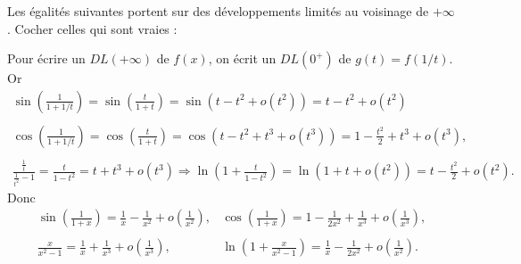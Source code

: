 \begin{question}
Les égalités suivantes portent sur des développements limités au voisinage de $+\infty$. Cocher celles qui sont vraies :
\begin{answers}  
\end{answers}
\vskip2mm
\begin{explanations}
Pour écrire un $DL(+\infty)$ de $f(x)$, on écrit un $DL(0^+)$ de $g(t)=f(1/t)$. Or
$$\begin{array}{l}\displaystyle \sin\left(\frac{1}{1+1/t}\right)=\sin \left(\frac{t}{1+t}\right)=\sin \left(t-t^2+o(t^2)\right)=t-t^2+o(t^2)\\ \\ \displaystyle \cos\left(\frac{1}{1+1/t}\right)=\cos \left(\frac{t}{1+t}\right)=\cos \left(t-t^2+t^3+o(t^3)\right)=1-\frac{t^2}{2}+t^3+o(t^3),\\ \\ \displaystyle \frac{\frac{1}{t}}{\frac{1}{t^2}-1}=\frac{t}{1-t^2}=t+t^3+o(t^3)\Rightarrow \ln \left(1+\frac{t}{1-t^2}\right)=\ln \left(1+t+o(t^2)\right)=t-\frac{t^2}{2}+o(t^2).\end{array}$$
Donc
$$\begin{array}{ll}\displaystyle \sin \left(\frac{1}{1+x}\right)=\frac{1}{x}-\frac{1}{x^2}+o\left(\frac{1}{x^2}\right),&\displaystyle \cos \left(\frac{1}{1+x}\right)=1-\frac{1}{2x^2}+\frac{1}{x^3}+o\left(\frac{1}{x^3}\right),\\ \\ \displaystyle \frac{x}{x^2-1}=\frac{1}{x}+\frac{1}{x^3}+o\left(\frac{1}{x^3}\right),&\displaystyle \ln \left(1+\frac{x}{x^2-1}\right)=\frac{1}{x}-\frac{1}{2x^2}+o\left(\frac{1}{x^2}\right).\end{array}$$
\end{explanations}
\end{question}

